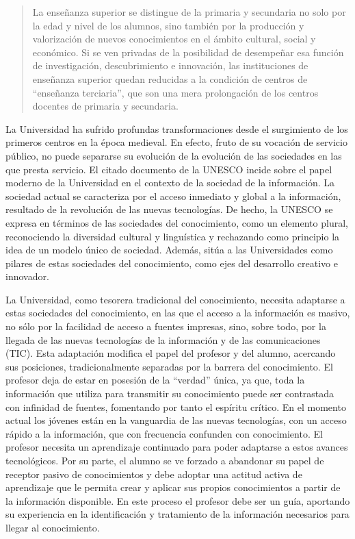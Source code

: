 \begin{quote}
La enseñanza superior se distingue de la primaria y secundaria no solo por la edad y nivel de los alumnos, sino también por la producción y valorización de nuevos conocimientos en el ámbito cultural, social y económico. Si se ven privadas de la posibilidad de desempeñar esa función de investigación, descubrimiento e innovación, las instituciones de enseñanza superior quedan reducidas a la condición de centros de ``enseñanza terciaria'', que son una mera prolongación de los centros docentes de primaria y secundaria.
\end{quote}

La Universidad ha sufrido profundas transformaciones desde el surgimiento de los primeros centros en la época medieval. En efecto, fruto de su vocación de servicio público, no puede separarse su evolución de la evolución de las sociedades en las que presta servicio. El citado documento de la UNESCO incide sobre el papel moderno de la Universidad en el contexto de la sociedad de la información. La sociedad actual se caracteriza por el acceso inmediato y global a la información, resultado de la revolución de las nuevas tecnologías. De hecho, la UNESCO se expresa en términos de las sociedades del conocimiento, como un elemento plural, reconociendo la diversidad cultural y linguística y rechazando como principio la idea de un modelo único de sociedad. Además, sitúa a las Universidades como pilares de estas sociedades del conocimiento, como ejes del desarrollo creativo e innovador. 


La Universidad, como tesorera tradicional del conocimiento, necesita adaptarse a estas sociedades del conocimiento, en las que el acceso a la información es masivo, no sólo por la facilidad de acceso a fuentes impresas, sino, sobre todo, por la llegada de las nuevas tecnologías de la información y de las comunicaciones (TIC). Esta adaptación modifica el papel del profesor y del alumno, acercando sus posiciones, tradicionalmente separadas por la barrera del conocimiento. El profesor deja de estar en posesión de la ``verdad'' única, ya que, toda la información que utiliza para transmitir su conocimiento puede ser contrastada con infinidad de fuentes, fomentando por tanto el espíritu crítico. 
En el momento actual los jóvenes están en la vanguardia de las nuevas tecnologías, con un acceso rápido a la información, que con frecuencia confunden con conocimiento. El profesor necesita un aprendizaje continuado para poder adaptarse a estos avances tecnológicos. Por su parte, el alumno se ve forzado a abandonar su papel de receptor pasivo de conocimientos y debe adoptar una actitud activa de aprendizaje que le permita crear y aplicar sus propios conocimientos a partir de la información disponible. En este proceso el profesor debe ser un guía, aportando su experiencia en la identificación y tratamiento de la información necesarios para llegar al conocimiento.


